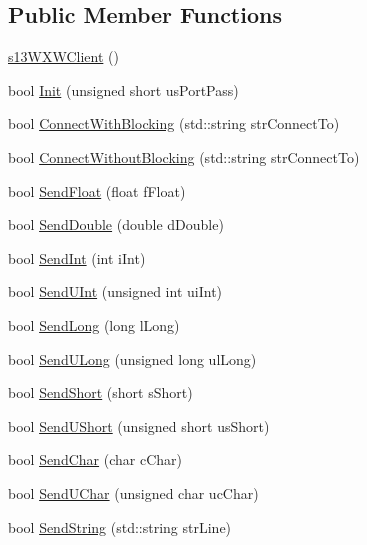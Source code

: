 \subsection*{Public Member Functions}
\begin{DoxyCompactItemize}
\item 
\hyperlink{classs13_w_x_w_client_ad007e2c6cf1643ebc527c38a46fad9ce}{s13\+W\+X\+W\+Client} ()
\item 
bool \hyperlink{classs13_w_x_w_client_a975d52dd1a7d3b8a7051eaa518c01ada}{Init} (unsigned short us\+Port\+Pass)
\item 
bool \hyperlink{classs13_w_x_w_client_a44f6cfad426454374edd40d9e499cc77}{Connect\+With\+Blocking} (std\+::string str\+Connect\+To)
\item 
bool \hyperlink{classs13_w_x_w_client_a41bc91cbdcf823e8ee9694bccfd07972}{Connect\+Without\+Blocking} (std\+::string str\+Connect\+To)
\item 
bool \hyperlink{classs13_w_x_w_client_acc4df9bec1294ae51bc1926d9e07922d}{Send\+Float} (float f\+Float)
\item 
bool \hyperlink{classs13_w_x_w_client_ab3c6741e78b8512acc281d151741e92f}{Send\+Double} (double d\+Double)
\item 
bool \hyperlink{classs13_w_x_w_client_ad267bd3689826cef2ad375b971eabe29}{Send\+Int} (int i\+Int)
\item 
bool \hyperlink{classs13_w_x_w_client_a79861ba63ed1a790dcfed94c5f6a55d8}{Send\+U\+Int} (unsigned int ui\+Int)
\item 
bool \hyperlink{classs13_w_x_w_client_af678a39e90c336da112222608e801ff9}{Send\+Long} (long l\+Long)
\item 
bool \hyperlink{classs13_w_x_w_client_aa20506ae25380df13200cc29a4f10ee8}{Send\+U\+Long} (unsigned long ul\+Long)
\item 
bool \hyperlink{classs13_w_x_w_client_a009660710450a0bcd79642d43fb7366b}{Send\+Short} (short s\+Short)
\item 
bool \hyperlink{classs13_w_x_w_client_ac9e85d0004fd32c060cba2592a555c1d}{Send\+U\+Short} (unsigned short us\+Short)
\item 
bool \hyperlink{classs13_w_x_w_client_ae38c47fc83227f9b0bcc5a9298efd564}{Send\+Char} (char c\+Char)
\item 
bool \hyperlink{classs13_w_x_w_client_a5e34e8823994835bf7b0a499ed7a6133}{Send\+U\+Char} (unsigned char uc\+Char)
\item 
bool \hyperlink{classs13_w_x_w_client_a06c706e2809466fb93bbed8f4cf4ce3e}{Send\+String} (std\+::string str\+Line)

\end{DoxyCompactItemize}
